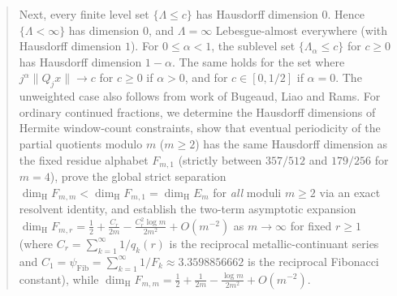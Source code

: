 \documentclass[11pt]{article}
\theoremstyle{definition}
\theoremstyle{remark}
\newcommand{\dimH}{\dim_{\mathrm{H}}}
\newcommand{\Lam}{\Lambda}
\begin{document}
\begin{abstract}
Next, every finite level set $\{\Lam\le c\}$ has Hausdorff dimension $0$.
Hence $\{\Lam<\infty\}$ has dimension $0$, and $\Lam=\infty$ Lebesgue-almost
everywhere (with Hausdorff dimension $1$). For $0\le\alpha<1$, the sublevel set $\{\Lam_\alpha\le c\}$ for $c\ge0$
has Hausdorff dimension $1-\alpha$. The same holds for the set where
$j^\alpha\|Q_jx\|\to c$ for $c\ge0$ if $\alpha>0$, and for
$c\in[0,1/2]$ if $\alpha=0$. The unweighted case also follows from work
of Bugeaud, Liao and Rams. For ordinary continued fractions,
we determine the Hausdorff dimensions of Hermite window-count constraints,
show that eventual periodicity of the partial quotients modulo $m$ ($m\ge2$) has
the same Hausdorff dimension as the fixed residue alphabet $F_{m,1}$ (strictly
between $357/512$ and $179/256$ for $m=4$), prove the global strict separation
$\dimH F_{m,m}<\dimH F_{m,1}=\dimH E_m$ for \emph{all} moduli $m\ge2$ via an
exact resolvent identity, and establish the two-term asymptotic expansion
$\dimH F_{m,r}=\frac12+\frac{C_r}{2m}-\frac{C_r^2\log m}{2m^2}+O(m^{-2})$ as
$m\to\infty$ for fixed $r\ge1$ (where $C_r=\sum_{k=1}^\infty 1/q_k(r)$ is the
reciprocal metallic-continuant series and $C_1=\psi_{\mathrm{Fib}}=\sum_{k=1}^\infty 1/F_k\approx3.3598856662$ is the reciprocal Fibonacci constant), while
$\dimH F_{m,m}=\frac12+\frac{1}{2m}-\frac{\log m}{2m^2}+O(m^{-2})$.


\end{abstract}
\end{document}
